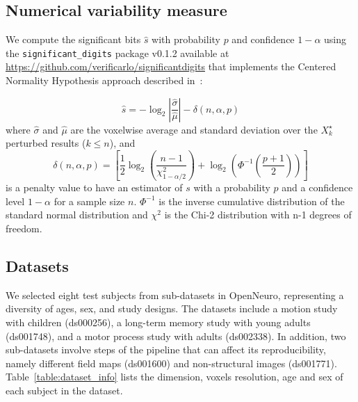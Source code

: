 \documentclass{article}
\begin{document}


\subsection*{Numerical variability measure}

We compute the significant bits $\hat{s}$ with probability $p$ and confidence $1-\alpha$ using the \texttt{significant\_digits} package v0.1.2 available at \url{https://github.com/verificarlo/significantdigits} that implements the Centered Normality Hypothesis approach described in~\cite{sohier2021confidence}:

\[
    \hat{s} = -\log_2 \left| \frac{\hat{\sigma}}{\hat{\mu}} \right| - \delta(n, \alpha, p)
\]
where $\hat{\sigma}$ and $\hat{\mu}$ are the voxelwise average and standard deviation over the $X_k^\star$ perturbed results ($k \leq n$), and
\[
    \delta(n, \alpha, p) =
    \left[
        \frac{1}{2} \log_2 \left( \frac{n-1}{\chi^2_{1-\alpha/2}} \right) +
        \log_2 \left( \Phi^{-1} \left( \frac{p+1}{2} \right) \right)
        \right]
\]
is a penalty value to have an estimator of $s$ with a probability $p$ and a confidence level $1-\alpha$ for a sample size $n$. $\Phi^{-1}$ is the inverse cumulative distribution of the standard normal distribution and $\chi^2$ is the Chi-2 distribution with n-1 degrees of freedom.

\subsection{Datasets}

We selected eight test subjects from sub-datasets in OpenNeuro, representing a diversity of ages, sex, and study designs. The datasets include a motion study with children (ds000256), a long-term memory study with young adults (ds001748), and a motor process study with adults (ds002338). In addition, two sub-datasets involve steps of the pipeline that can affect its reproducibility, namely different field maps (ds001600) and non-structural images (ds001771). Table~\ref{table:dataset_info} lists the dimension, voxels resolution, age and sex of each subject in the dataset.
\end{document}
